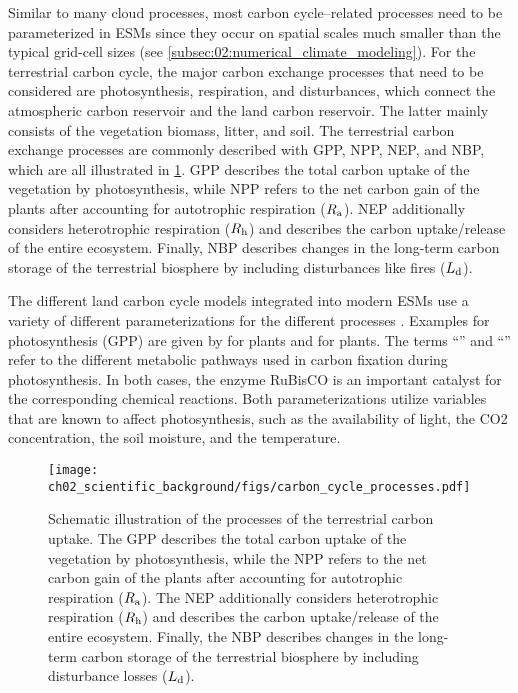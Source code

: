 Similar to many cloud processes, most carbon cycle--related processes need to
be parameterized in \acp{ESM} since they occur on spatial scales much smaller
than the typical grid-cell sizes (see
\cref{subsec:02:numerical_climate_modeling}). For the terrestrial carbon cycle,
the major carbon exchange processes that need to be considered are
photosynthesis, respiration, and disturbances, which connect the atmospheric
carbon reservoir and the land carbon reservoir. The latter mainly consists of
the vegetation biomass, litter, and soil. The terrestrial carbon exchange
processes are commonly described with \ac{GPP}, \ac{NPP}, \ac{NEP}, and
\ac{NBP}, which are all illustrated in \cref{fig:02:carbon_cycle_processes}.
\Ac{GPP} describes the total carbon uptake of the vegetation by photosynthesis,
while \ac{NPP} refers to the net carbon gain of the plants after accounting for
autotrophic respiration ($R_{\textnormal{a}}{}$). \Ac{NEP} additionally considers
heterotrophic respiration ($R_{\textnormal{h}}{}$) and describes the carbon uptake/release of
the entire ecosystem. Finally, \ac{NBP} describes changes in the long-term
carbon storage of the terrestrial biosphere by including disturbances like
fires ($L_{\textnormal{d}}{}$).

The different land carbon cycle models integrated into modern \acp{ESM} use a
variety of different parameterizations for the different processes
\autocite{Arora2020}. Examples for photosynthesis (\ac{GPP}) are given by
\textcite{Farquhar1980} for  plants and \textcite{Collatz1992} for
 plants. The terms \enquote{} and \enquote{} refer to the
different metabolic pathways used in carbon fixation during photosynthesis. In
both cases, the enzyme \ac{RuBisCO} is an important catalyst for the
corresponding chemical reactions. Both parameterizations utilize variables that
are known to affect photosynthesis, such as the availability of light, the
\ac{CO2} concentration, the soil moisture, and the temperature.

\begin{figure}[t]
  \centering
  \texttt{[image: 
    ch02\_scientific\_background/figs/carbon\_cycle\_processes.pdf]}
  \caption[
  Schematic illustration of the processes of the terrestrial carbon uptake.
  ]{
    Schematic illustration of the processes of the terrestrial carbon uptake.
    The \acf{GPP} describes the total carbon uptake of the vegetation by
    photosynthesis, while the \acf{NPP} refers to the net carbon gain of the
    plants after accounting for autotrophic respiration ($R_{\textnormal{a}}{}$). The
    \acf{NEP} additionally considers heterotrophic respiration ($R_{\textnormal{h}}{}$) and
    describes the carbon uptake/release of the entire ecosystem. Finally, the
    \acf{NBP} describes changes in the long-term carbon storage of the
    terrestrial biosphere by including disturbance losses ($L_{\textnormal{d}}{}$).
  }
  \label{fig:02:carbon_cycle_processes}
\end{figure}


